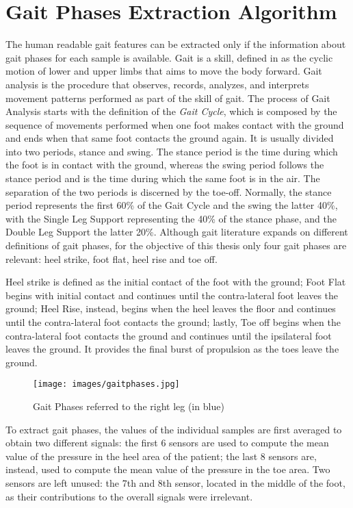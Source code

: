 \section{Gait Phases Extraction Algorithm}
The human readable gait features can be extracted only if the information about gait phases for each sample is available. 
Gait is a skill, defined in \cite{BIOmechanics} as the cyclic motion of lower and upper limbs that aims to move the body forward. Gait analysis is the procedure that observes, records, analyzes, and interprets movement patterns performed as part of the skill of gait.
The process of Gait Analysis starts with the definition of the \textit{Gait Cycle}, which is composed by the sequence of movements performed when one foot makes contact with the ground and ends when that same foot contacts the ground again. It is usually divided into two periods, stance and swing. The stance period is the time during which the foot is in contact with the ground, whereas the swing period follows the stance period and is the time during which the same foot is in the air. The separation of the two periods is discerned by the
toe-off.
Normally, the stance period represents the first
60\% of the Gait Cycle and the swing the latter 40\%, with the Single Leg Support representing the 40\% of the stance phase, and the Double Leg Support the latter 20\%. 
Although gait literature expands on different definitions of gait phases, for the objective of this thesis only four  gait phases are relevant: heel strike, foot flat, heel rise and toe off.

Heel strike is defined as the initial contact of the foot with the ground; Foot Flat begins with initial contact and continues until the contra-lateral foot leaves the ground; Heel Rise, instead, begins when the heel leaves the floor and continues until the contra-lateral foot contacts the ground; lastly, Toe off begins when the contra-lateral foot contacts the ground and continues until the ipsilateral foot leaves the ground. It provides the final burst of propulsion as the toes leave the ground.

\begin{figure}[ht!]
    \centering
    \texttt{[image: images/gaitphases.jpg]}
    \caption{Gait Phases referred to the right leg (in blue)}
    \label{fig:gaitphases}
\end{figure}
To extract gait phases, the values of the individual samples are first averaged to obtain two different signals: the first 6 sensors are used to compute the mean value of the pressure in the heel area of the patient; the last 8 sensors are, instead, used to compute the mean value of the pressure in the toe area. Two sensors are left unused: the 7th and 8th sensor, located in the middle of the foot, as their contributions to the overall signals were irrelevant.


